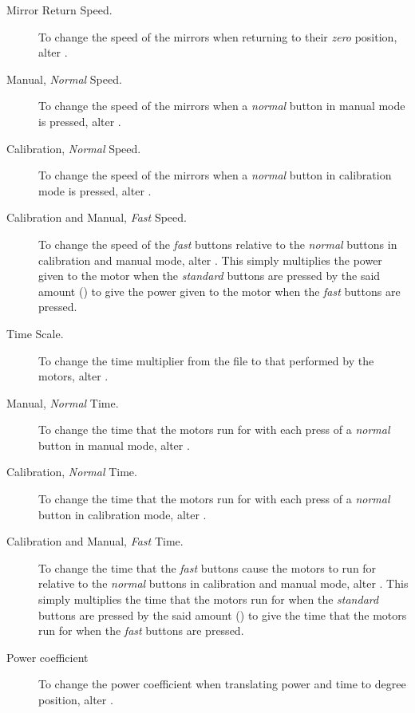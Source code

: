 \documentclass[a4paper, 12pt]{book}
\begin{document}
\begin{description}
\item [Mirror Return Speed.] To change the speed of the mirrors when returning to their \textit{zero} position, alter .

\item [Manual, \textit{Normal} Speed.] To change the speed of the mirrors when a \textit{normal} button in manual mode is pressed, alter .

\item [Calibration, \textit{Normal} Speed.] To change the speed of the mirrors when a \textit{normal} button in calibration mode is pressed, alter .

\item [Calibration and Manual, \textit{Fast} Speed.] To change the speed of the \textit{fast} buttons relative to the \textit{normal} buttons in calibration and manual mode, alter . This simply multiplies the power given to the motor when the \textit{standard} buttons are pressed by the said amount () to give the power given to the motor when the \textit{fast} buttons are pressed.

\item [Time Scale.] To change the time multiplier from the  file to that performed by the motors, alter .

\item [Manual, \textit{Normal} Time.] To change the time that the motors run for with each press of a \textit{normal} button in manual mode, alter .

\item [Calibration, \textit{Normal} Time.] To change the time that the motors run for with each press of a \textit{normal} button in calibration mode, alter .

\item [Calibration and Manual, \textit{Fast} Time.] To change the time that the \textit{fast} buttons cause the motors to run for relative to the \textit{normal} buttons in calibration and manual mode, alter . This simply multiplies the time that the motors run for when the \textit{standard} buttons are pressed by the said amount () to give the time that the motors run for when the \textit{fast} buttons are pressed.

\item [Power coefficient] To change the power coefficient when translating power and time to degree position, alter .
\end{description}
\end{document}
